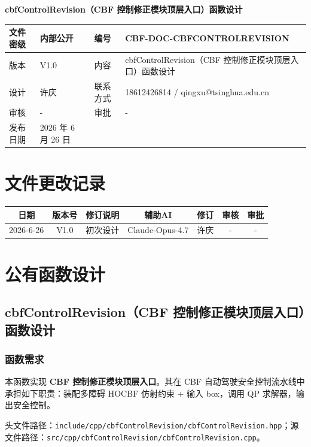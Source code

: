 \documentclass[a4paper,10pt]{article}
\begin{document}
\begin{titlepage}
    \centering
    {\Huge\textbf{cbfControlRevision（CBF 控制修正模块顶层入口）函数设计}\par}
    \vspace{1.5cm}
    \renewcommand{\arraystretch}{1.5}
    \begin{tabular}{|l|l|l|l|}
        \hline
        文件密级 & 内部公开 & 编号 & CBF-DOC-CBFCONTROLREVISION \\ \hline
        版本 & V1.0 & 内容 & cbfControlRevision（CBF 控制修正模块顶层入口）函数设计 \\ \hline
        设计 & 许庆 & 联系方式 & 18612426814 / qingxu@tsinghua.edu.cn \\ \hline
        审核 & - & 审批 & - \\ \hline
        发布日期 & 2026 年 6 月 26 日 & & \\ \hline
    \end{tabular}
    \vspace{1.5cm}
    \section*{文件更改记录}
    \begin{longtable}{|c|c|p{4cm}|c|c|c|c|}
        \hline
        日期 & 版本号 & 修订说明 & 辅助AI & 修订 & 审核 & 审批 \\ \hline
        2026-6-26 & V1.0 & 初次设计 & Claude-Opus-4.7 & 许庆 & - & - \\ \hline
    \end{longtable}
\end{titlepage}
\tableofcontents
\newpage
\section{公有函数设计}
\subsection{cbfControlRevision（CBF 控制修正模块顶层入口）函数设计}
\subsubsection{函数需求}
\par 本函数实现 \textbf{CBF 控制修正模块顶层入口}。其在 CBF 自动驾驶安全控制流水线中承担如下职责：装配多障碍 HOCBF 仿射约束 + 输入 box，调用 QP 求解器，输出安全控制。
\par 头文件路径：\texttt{include/cpp/cbfControlRevision/cbfControlRevision.hpp}；源文件路径：\texttt{src/cpp/cbfControlRevision/cbfControlRevision.cpp}。
\end{document}
